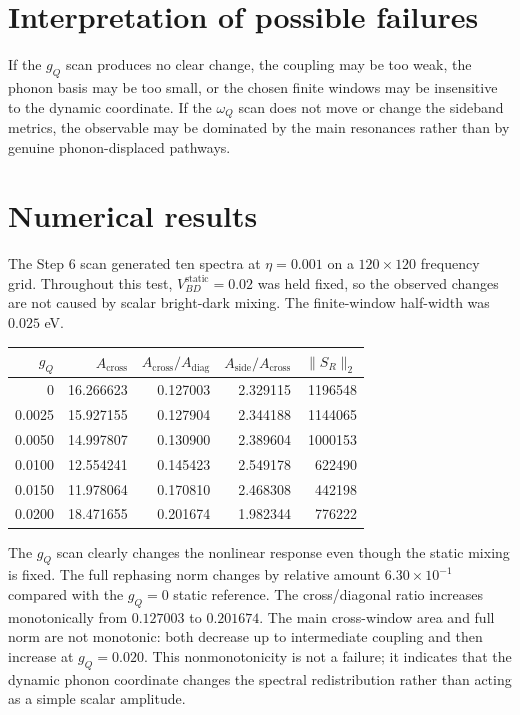 \documentclass[11pt]{article}
\begin{document}
\section{Interpretation of possible failures}
If the $g_Q$ scan produces no clear change, the coupling may be too weak, the
phonon basis may be too small, or the chosen finite windows may be insensitive
to the dynamic coordinate.  If the $\omega_Q$ scan does not move or change the
sideband metrics, the observable may be dominated by the main resonances rather
than by genuine phonon-displaced pathways.

\section{Numerical results}
The Step 6 scan generated ten spectra at $\eta=0.001$ on a $120\times120$
frequency grid.  Throughout this test,
$V_{BD}^{\mathrm{static}}=0.02$ was held fixed, so the observed changes are not
caused by scalar bright-dark mixing.  The finite-window half-width was
$0.025$ eV.

\begin{center}
\begin{tabular}{rrrrr}
\toprule
$g_Q$ & $A_{\mathrm{cross}}$ &
$A_{\mathrm{cross}}/A_{\mathrm{diag}}$ &
$A_{\mathrm{side}}/A_{\mathrm{cross}}$ & $\|S_R\|_2$ \\
\midrule
0 & 16.266623 & 0.127003 & 2.329115 & 1196548 \\
0.0025 & 15.927155 & 0.127904 & 2.344188 & 1144065 \\
0.0050 & 14.997807 & 0.130900 & 2.389604 & 1000153 \\
0.0100 & 12.554241 & 0.145423 & 2.549178 & 622490 \\
0.0150 & 11.978064 & 0.170810 & 2.468308 & 442198 \\
0.0200 & 18.471655 & 0.201674 & 1.982344 & 776222 \\
\bottomrule
\end{tabular}
\end{center}

The $g_Q$ scan clearly changes the nonlinear response even though the static
mixing is fixed.  The full rephasing norm changes by relative amount
$6.30\times10^{-1}$ compared with the $g_Q=0$ static reference.  The
cross/diagonal ratio increases monotonically from $0.127003$ to $0.201674$.
The main cross-window area and full norm are not monotonic: both decrease up to
intermediate coupling and then increase at $g_Q=0.020$.  This nonmonotonicity is
not a failure; it indicates that the dynamic phonon coordinate changes the
spectral redistribution rather than acting as a simple scalar amplitude.
\end{document}

